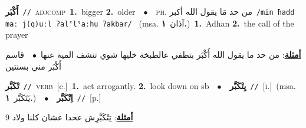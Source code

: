 \documentclass[10pt,a4paper,twoside]{article} %
\begin{document}
\begin{multicols}{2}
{{{{{{{{{{{\setlength\topsep{0pt}\textbf{\foreignlanguage{arabic}{أَكْبَر}}\ {\color{gray}\texttt{//}\color{black}}\ \textsc{adj\textunderscore comp}\ \textbf{1.}~bigger  \textbf{2.}~older\ \ $\bullet$\ \ \textsc{ph.} \color{gray} \foreignlanguage{arabic}{من حد مَا يقول الله أكبر}\color{black}\ {\color{gray}\texttt{/{\sffamily min ħadd maː j(q)uːl ʔalˤlˤaːhu ʔakbar}/}\color{black}}\ \color{gray} (msa. \foreignlanguage{arabic}{آذان}~\foreignlanguage{arabic}{\textbf{١.}})\color{black}\ \textbf{1.}~Adhan  \textbf{2.}~the call of the prayer\  \begin{flushright}\color{gray}\foreignlanguage{arabic}{\textbf{\underline{\foreignlanguage{arabic}{أمثلة}}}: من حد ما يقول الله أَكْبَر بتطفي عالطبخة خليها شوي تنشف المية عنها\ $\bullet$\ \  قاسم أَكْبَر مني بسنتين}\end{flushright}\color{black}} \vspace{2mm}

{\setlength\topsep{0pt}\textbf{\foreignlanguage{arabic}{تْكَبَّر}}\ {\color{gray}\texttt{//}\color{black}}\ \textsc{verb}\ [c.]\ \textbf{1.}~act arrogantly.  \textbf{2.}~look down on sb\ \ $\bullet$\ \ \setlength\topsep{0pt}\textbf{\foreignlanguage{arabic}{يِتْكَبَّر}}\ {\color{gray}\texttt{//}\color{black}}\ [i.]\ \color{gray}(msa. \foreignlanguage{arabic}{يَتَكَبَّر}~\foreignlanguage{arabic}{\textbf{١.}})\color{black}\ \ $\bullet$\ \ \setlength\topsep{0pt}\textbf{\foreignlanguage{arabic}{اِتْكَبَّر}}\ {\color{gray}\texttt{//}\color{black}}\ [p.]\  \begin{flushright}\color{gray}\foreignlanguage{arabic}{\textbf{\underline{\foreignlanguage{arabic}{أمثلة}}}: تِتْكَبَّرِش عحدا عشان كلنا ولاد 9}\end{flushright}\color{black}} \vspace{2mm}

}}}}}}}}}}
\end{multicols}
\end{document}
